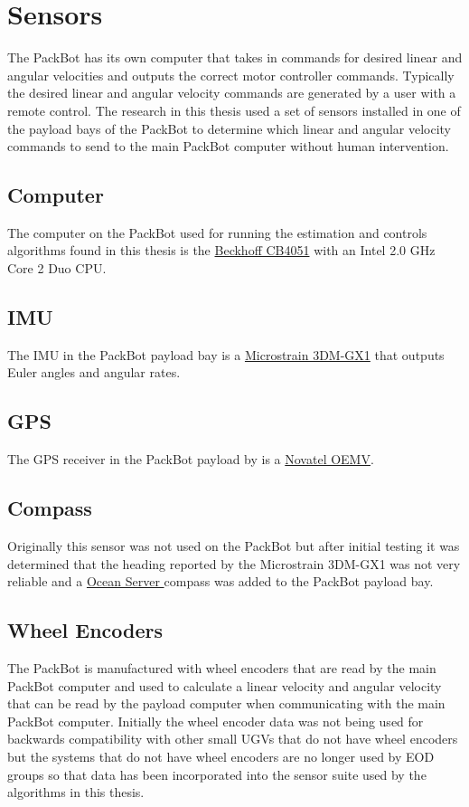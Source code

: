\section{Sensors}
\label{sec:bgSensors}
The PackBot has its own computer that takes in commands for desired linear and angular velocities and outputs the correct motor controller commands. Typically the desired linear and angular velocity commands are generated by a user with a remote control. The research in this thesis used a set of sensors installed in one of the payload bays of the PackBot to determine which linear and angular velocity commands to send to the main PackBot computer without human intervention.

\subsection{Computer}
\label{sec:bgComputer}
The computer on the PackBot used for running the estimation and controls algorithms found in this thesis is the \href{http://www.beckhoff.com/english.asp?motherboards/cb4051.htm}{Beckhoff CB4051} with an Intel 2.0 GHz Core 2 Duo CPU.

\subsection{IMU}
\label{sec:bgIMU}
The IMU in the PackBot payload bay is a \href{http://www.microstrain.com/3dm-gx1.aspx}{Microstrain 3DM-GX1} that outputs Euler angles and angular rates.

\subsection{GPS}
\label{sec:bgGPS}
The GPS receiver in the PackBot payload by is a \href{http://www.novatel.com/products/gnss-receivers/oem-receiver-boards/oemv-receivers/}{Novatel OEMV}.

\subsection{Compass}
\label{sec:bgCompass}
Originally this sensor was not used on the PackBot but after initial testing it was determined that the heading reported by the Microstrain 3DM-GX1 was not very reliable and a \href{http://www.oceanserver-store.com/os3axdico3.html}{Ocean Server } compass was added to the PackBot payload bay.

\subsection{Wheel Encoders}
\label{sec:bgEncoders}
The PackBot is manufactured with wheel encoders that are read by the main PackBot computer and used to calculate a linear velocity and angular velocity that can be read by the payload computer when communicating with the main PackBot computer. Initially the wheel encoder data was not being used for backwards compatibility with other small UGVs that do not have wheel encoders but the systems that do not have wheel encoders are no longer used by EOD groups so that data has been incorporated into the sensor suite used by the algorithms in this thesis.

